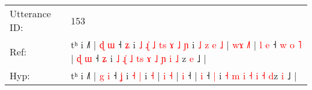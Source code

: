 \documentclass[10pt]{article}
\DeclareRobustCommand{\hl}[1]{{\textcolor{red}{#1}}}
\begin{document}
\begin{longtable}{ll}
 \\
\midrule
Utterance ID: & 153 \\
Ref: & tʰ i ˩˥ | \hl{ɖ} \hl{ɯ} ˧ \hl{ʑ} i\hl{ }\hl{˩}\hl{ }\hl{ɻ}\hl{̍}\hl{ }\hl{˩}\hl{ }\hl{t}\hl{s}\hl{ }\hl{ɤ} \hl{˩} \hl{ɲ} i\hl{ }\hl{˩}\hl{ }\hl{z}\hl{ }\hl{e} \hl{˩} | \hl{w}\hl{ɤ} \hl{˩}\hl{˥} |\hl{ }\hl{l} \hl{e} ˧\hl{ }\hl{w}\hl{ }\hl{o}\hl{ }\hl{˥} |\hl{ }\hl{ɖ} \hl{ɯ} ˧ \hl{ʑ} i\hl{ }\hl{˩}\hl{ }\hl{ɻ}\hl{̍} \hl{˩} \hl{t}\hl{s} \hl{ɤ} \hl{˩} \hl{ɲ} \hl{i} \hl{˩}\hl{ }z \hl{e} ˩ |
 \\
Hyp: & tʰ i ˩˥ | \hl{g} \hl{i} ˧ \hl{ʝ} i\hl{}\hl{}\hl{}\hl{}\hl{}\hl{}\hl{}\hl{}\hl{}\hl{}\hl{}\hl{} \hl{˧} \hl{|} i\hl{}\hl{}\hl{}\hl{}\hl{}\hl{} \hl{˧} | \hl{}\hl{i} \hl{}\hl{˧} |\hl{}\hl{} \hl{i} ˧\hl{}\hl{}\hl{}\hl{}\hl{}\hl{} |\hl{}\hl{} \hl{i} ˧ \hl{|} i\hl{}\hl{}\hl{}\hl{}\hl{} \hl{˧} \hl{}\hl{m} \hl{i} \hl{˧} \hl{i} \hl{˧} \hl{}\hl{d}z \hl{i} ˩ |
 \\
\midrule
\end{longtable}
\end{document}
